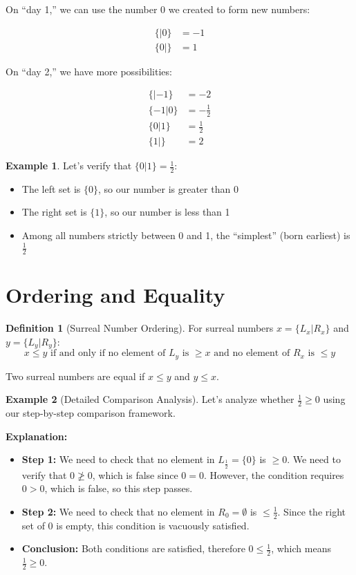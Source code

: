 \documentclass[11pt,a4paper]{article}
\theoremstyle{definition}
\newtheorem{definition}{Definition}[section]
\newtheorem{example}{Example}[section]
\begin{document}
On ``day 1,'' we can use the number 0 we created to form new numbers:

\begin{align}
\{|0\} &= -1 \\
\{0|\} &= 1
\end{align}

On ``day 2,'' we have more possibilities:

\begin{align}
\{|-1\} &= -2 \\
\{-1|0\} &= -\frac{1}{2} \\
\{0|1\} &= \frac{1}{2} \\
\{1|\} &= 2
\end{align}

\begin{example}
Let's verify that $\{0|1\} = \frac{1}{2}$:
\begin{itemize}
    \item The left set is $\{0\}$, so our number is greater than 0
    \item The right set is $\{1\}$, so our number is less than 1
    \item Among all numbers strictly between 0 and 1, the ``simplest'' (born earliest) is $\frac{1}{2}$
\end{itemize}
\end{example}

\section{Ordering and Equality}

\begin{definition}[Surreal Number Ordering]
For surreal numbers $x = \{L_x|R_x\}$ and $y = \{L_y|R_y\}$:
$$x \leq y \text{ if and only if } \text{no element of } L_y \text{ is } \geq x \text{ and no element of } R_x \text{ is } \leq y$$
\end{definition}

Two surreal numbers are equal if $x \leq y$ and $y \leq x$.

\begin{example}[Detailed Comparison Analysis]
Let's analyze whether $\frac{1}{2} \geq 0$ using our step-by-step comparison framework.


\noindent\textbf{Explanation:}
\begin{itemize}
    \item \textbf{Step 1:} We need to check that no element in $L_{\frac{1}{2}} = \{0\}$ is $\geq 0$. We need to verify that $0 \not\geq 0$, which is false since $0 = 0$. However, the condition requires $0 > 0$, which is false, so this step passes.
    \item \textbf{Step 2:} We need to check that no element in $R_{0} = \emptyset$ is $\leq \frac{1}{2}$. Since the right set of 0 is empty, this condition is vacuously satisfied.
    \item \textbf{Conclusion:} Both conditions are satisfied, therefore $0 \leq \frac{1}{2}$, which means $\frac{1}{2} \geq 0$.
\end{itemize}
\end{example}
\end{document}
